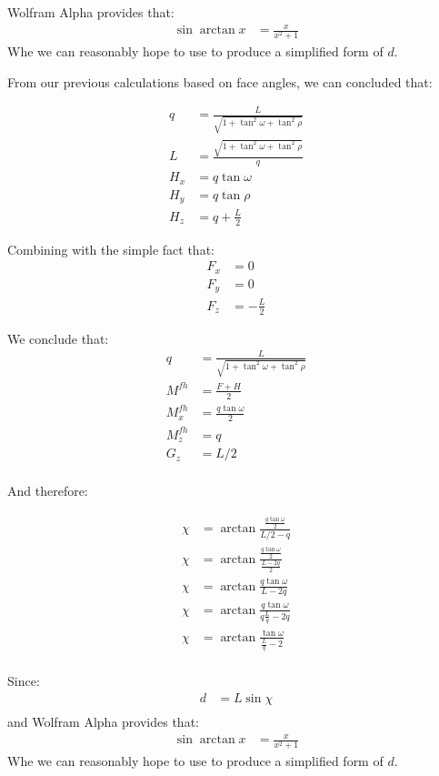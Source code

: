 \documentclass[11pt]{article}
\begin{document}
Wolfram Alpha provides that:
\begin{align}
  \sin{\arctan{x}} &= \frac{x}{x^2 + 1}
\end{align}
Whe we can reasonably hope to use to produce a simplified form of
$d$.

From our previous calculations based on face angles, we can
concluded that:

\begin{align}
  q &= \frac{L}{\sqrt{1 + \tan^2{\omega} + \tan^2{\rho}}}  \\
  L &= \frac{\sqrt{1 + \tan^2{\omega} + \tan^2{\rho}}}{q}  \\  
  H_x &= q \tan{\omega} \\
  H_y &= q \tan{\rho} \\
  H_z &= q + \frac{L}{2}
\end{align}

Combining with the simple fact that:
\begin{align}
  F_x &= 0 \\
  F_y &= 0  \\
  F_z &= - \frac{L}{2}
\end{align}

We conclude that:
\begin{align}
  q &= \frac{L}{\sqrt{1 + \tan^2{\omega} + \tan^2{\rho}}}  \\  
  M^{fh} &= \frac{F + H}{2} \\
  M^{fh}_x &= \frac{q \tan{\omega}}{2} \\
  M^{fh}_z &= q \\
  G_z &= L/2 \\
\end{align}

And therefore:

\begin{align}
  \chi &= \arctan{\frac{\frac{q \tan{\omega}}{2}}{L/2 - q}} \\
  \chi &= \arctan{\frac{\frac{q \tan{\omega}}{2}}{\frac{L - 2q}{2}}} \\
  \chi &= \arctan{\frac{q \tan{\omega}}{L - 2q}} \\
  \chi &= \arctan{\frac{q \tan{\omega}}{q\frac{L}{q} - 2q}} \\
  \chi &= \arctan{\frac{ \tan{\omega}}{\frac{L}{q} - 2}} \\
\end{align}

Since:
\begin{align}
  d &= L \sin{\chi} \\
\end{align}
and Wolfram Alpha provides that:
\begin{align}
  \sin{\arctan{x}} &= \frac{x}{x^2 + 1}
\end{align}
Whe we can reasonably hope to use to produce a simplified form of
$d$.
\end{document}
